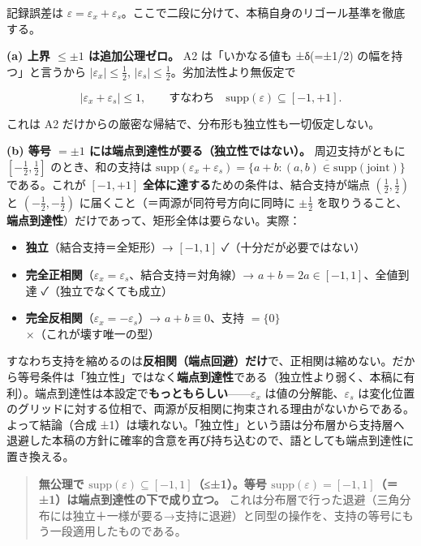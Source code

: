 \documentclass[
]{ltjsarticle}
\providecommand{\tightlist}{%
  \setlength{\itemsep}{0pt}\setlength{\parskip}{0pt}}
\begin{document}
記録誤差は
\(\varepsilon=\varepsilon_x+\varepsilon_s\)。ここで二段に分けて、本稿自身のリゴール基準を徹底する。

\textbf{(a) 上界 \(\le\pm1\) は追加公理ゼロ。} A2 は「いかなる値も
±δ(=±1/2) の幅を持つ」と言うから \(|\varepsilon_x|\le\tfrac12\),
\(|\varepsilon_s|\le\tfrac12\)。劣加法性より無仮定で

\[
|\varepsilon_x+\varepsilon_s|\le 1,\qquad\text{すなわち}\quad \mathrm{supp}(\varepsilon)\subseteq[-1,+1].
\]

これは A2 だけからの厳密な帰結で、分布形も独立性も一切仮定しない。

\textbf{(b) 等号 \(=\pm1\) には端点到達性が要る（独立性ではない）。}
周辺支持がともに \([-\tfrac12,\tfrac12]\) のとき、和の支持は
\(\mathrm{supp}(\varepsilon_x+\varepsilon_s)=\overline{\{a+b:(a,b)\in\mathrm{supp(joint)}\}}\)
である。これが \([-1,+1]\)
\textbf{全体に達する}ための条件は、結合支持が端点
\((\tfrac12,\tfrac12)\) と \((-\tfrac12,-\tfrac12)\)
に届くこと（＝両源が同符号方向に同時に \(\pm\tfrac12\)
を取りうること、\textbf{端点到達性}）だけであって、矩形全体は要らない。実際：

\begin{itemize}
\tightlist
\item
  \textbf{独立}（結合支持＝全矩形）→ \([-1,1]\)
  ✓（十分だが必要ではない）
\item
  \textbf{完全正相関}（\(\varepsilon_x=\varepsilon_s\)、結合支持＝対角線）→
  \(a+b=2a\in[-1,1]\)、全値到達 ✓（独立でなくても成立）
\item
  \textbf{完全反相関}（\(\varepsilon_x=-\varepsilon_s\)）→
  \(a+b\equiv0\)、支持 \(=\{0\}\) ×（これが壊す唯一の型）
\end{itemize}

すなわち支持を縮めるのは\textbf{反相関（端点回避）だけ}で、正相関は縮めない。だから等号条件は「独立性」ではなく\textbf{端点到達性}である（独立性より弱く、本稿に有利）。端点到達性は本設定で\textbf{もっともらしい}------\(\varepsilon_x\)
は値の分解能、\(\varepsilon_s\)
は変化位置のグリッドに対する位相で、両源が反相関に拘束される理由がないからである。よって結論（合成
±1）は壊れない。「独立性」という語は分布層から支持層へ退避した本稿の方針に確率的含意を再び持ち込むので、語としても端点到達性に置き換える。

\begin{quote}
\textbf{無公理で
\(\mathrm{supp}(\varepsilon)\subseteq[-1,1]\)（≤±1）。等号
\(\mathrm{supp}(\varepsilon)=[-1,1]\)（＝±1）は端点到達性の下で成り立つ。}
これは分布層で行った退避（三角分布には独立＋一様が要る→支持に退避）と同型の操作を、支持の等号にもう一段適用したものである。
\end{quote}
\end{document}
